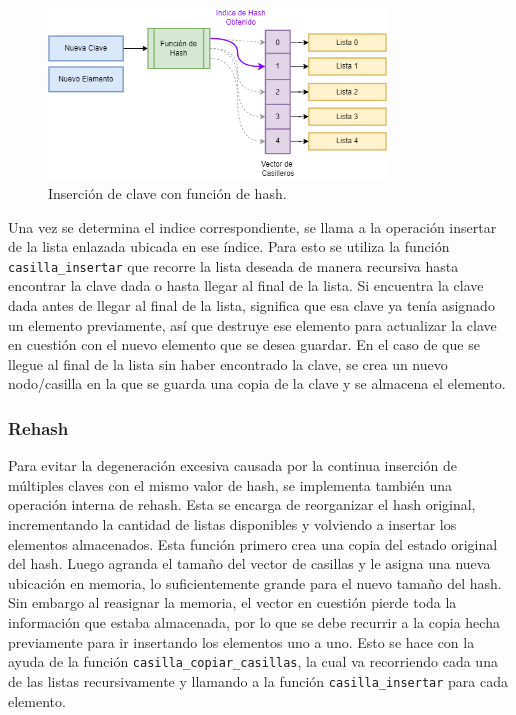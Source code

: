 \documentclass[titlepage,a4paper]{article}
\begin{document}
\begin{figure}[H]
\centering
\includegraphics[width=0.8\textwidth]{img/3_hash_insercion.png}
\caption{\label{fig:seq03}Inserción de clave con función de hash.}
\end{figure}

Una vez se determina el indice correspondiente, se llama a la operación insertar
de la lista enlazada ubicada en ese índice. Para esto se utiliza la función
\lstinline{casilla_insertar} que recorre la lista deseada de manera recursiva
hasta encontrar la clave dada o hasta llegar al final de la lista. Si encuentra
la clave dada antes de llegar al final de la lista, significa que esa clave ya
tenía asignado un elemento previamente, así que destruye ese elemento para
actualizar la clave en cuestión con el nuevo elemento que se desea guardar.  En
el caso de que se llegue al final de la lista sin haber encontrado la clave, se
crea un nuevo nodo/casilla en la que se guarda una copia de la clave y se
almacena el elemento.

                             \subsubsection{Rehash}

Para evitar la degeneración excesiva causada por la continua inserción de
múltiples claves con el mismo valor de hash, se implementa también una operación
interna de rehash. Esta se encarga de reorganizar el hash original,
incrementando la cantidad de listas disponibles y volviendo a insertar los
elementos almacenados. Esta función primero crea una copia del estado original
del hash. Luego agranda el tamaño del vector de casillas y le asigna una nueva
ubicación en memoria, lo suficientemente grande para el nuevo tamaño del hash.
Sin embargo al reasignar la memoria, el vector en cuestión pierde toda la
información que estaba almacenada, por lo que se debe recurrir a la copia hecha
previamente para ir insertando los elementos uno a uno. Esto se hace con la
ayuda de la función \lstinline{casilla_copiar_casillas}, la cual va recorriendo
cada una de las listas recursivamente y llamando a la función
\lstinline{casilla_insertar} para cada elemento.
\end{document}
